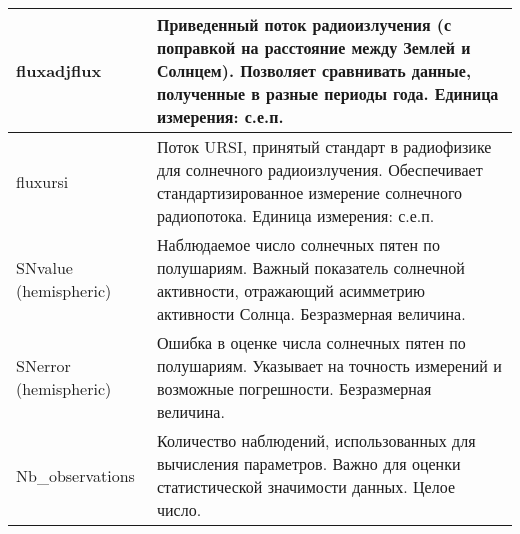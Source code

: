 \begin{longtable}{|l|p{12cm}|}
	\hline
	fluxadjflux           & Приведенный поток радиоизлучения (с поправкой на расстояние между Землей и Солнцем). Позволяет сравнивать данные, полученные в разные периоды года. Единица измерения: с.е.п.                                                                                                                                                                                                                                                                                                                                    \\
	\hline
	fluxursi              & Поток URSI, принятый стандарт в радиофизике для солнечного радиоизлучения. Обеспечивает стандартизированное измерение солнечного радиопотока. Единица измерения: с.е.п.                                                                                                                                                                                                                                                                                                                                          \\
	\hline
	SNvalue (hemispheric) & Наблюдаемое число солнечных пятен по полушариям. Важный показатель солнечной активности, отражающий асимметрию активности Солнца. Безразмерная величина.                                                                                                                                                                                                                                                                                                                                                         \\
	\hline
	SNerror (hemispheric) & Ошибка в оценке числа солнечных пятен по полушариям. Указывает на точность измерений и возможные погрешности. Безразмерная величина.                                                                                                                                                                                                                                                                                                                                                                             \\
	\hline
	Nb\_observations      & Количество наблюдений, использованных для вычисления параметров. Важно для оценки статистической значимости данных. Целое число.                                                                                                                                                                                                                                                                                                                                                                                 \\
\end{longtable}

